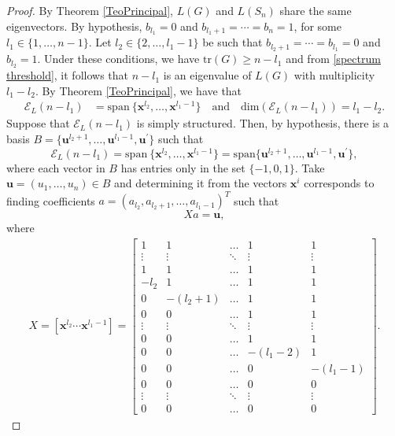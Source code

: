 \documentclass[10pt,a4paper]{amsart}
\begin{document}
\begin{proof}
By Theorem \ref{TeoPrincipal}, $L(G)$ and $L(S_n)$ share the same eigenvectors. By hypothesis,  $b_{l_1}=0$ and $b_{l_1+1}=\cdots=b_{n}=1$, for some $l_1 \in \{1, \ldots, n-1\}$. Let $l_2 \in \{2, \ldots,l_1-1\}$ be such that $b_{l_2+1}=\cdots=b_{l_1}=0$ and $b_{l_2}=1$. Under these conditions, we have $\text{tr}(G)\geq n-l_1$ and from \eqref{spectrum  threshold}, it follows that $n-l_1$ is an eigenvalue of $L(G)$ with multiplicity $l_1-l_2$. By Theorem \ref{TeoPrincipal}, we have that  
\begin{align*}
    \mathcal{E}_L(n-l_1)&=\mathrm{span} \ \{ \mathbf{x}^{l_2}, \ldots, \mathbf{x}^{l_1-1} \} \quad  \textrm{and} \quad \mathrm{dim}(\mathcal{E}_{L}(n-l_1)) = l_1-l_2.
\end{align*} 
Suppose that $\mathcal{E}_L(n-l_1)$ is simply structured. Then, by hypothesis, there is a basis $B=\{\mathbf{u}^{l_2+1}, \ldots, \mathbf{u}^{l_1-1}, \mathbf{u}^{\prime}\}$ such that 
$$\mathcal{E}_L(n-l_1)=\mathrm{span} \ \{ \mathbf{x}^{l_2}, \ldots, \mathbf{x}^{l_1-1} \} = \mathrm{span}\{\mathbf{u}^{l_2+1}, \ldots, \mathbf{u}^{l_1-1},\mathbf{u}^{\prime}\},$$
where each vector in $B$ has entries only in the set $\{-1,0,1\}$.
Take $\mathbf{u}=(u_{1}, \ldots, u_{n}) \in B$ and determining it from the vectors $\mathbf{x}^{i}$ corresponds to finding coefficients $a=(a_{l_2}, a_{l_2+1}, \ldots, a_{l_1-1})^{T}$ such that 
\begin{equation}\label{eq:sistemalinear(n-k)}
    X a = \mathbf{u},
\end{equation}
where 
\begin{align*}
    X=[\mathbf{x}^{l_2}\cdots\mathbf{x}^{l_1-1}]=\left[\begin{array}{ccccc}
        1          & 1            & \ldots      & 1           & 1 \\ 
        \vdots     & \vdots       & \ddots      & \vdots      & \vdots \\ 
        1          & 1            & \ldots      & 1           & 1 \\
        -l_2         & 1            & \ldots      & 1           & 1 \\ 
        0          & -(l_2+1)       & \ldots      & 1           & 1 \\ 
        0          & 0            & \ldots      & 1           & 1 \\
        \vdots     & \vdots       & \ddots      & \vdots      & \vdots \\ 
        0          & 0            & \ldots      & 1           & 1 \\ 
        0          & 0            & \ldots      & -(l_1-2)    & 1 \\ 
        0          & 0            & \ldots      & 0           & -(l_1-1) \\
        0          & 0            & \ldots      & 0           & 0 \\ 
        \vdots     & \vdots       & \ddots      & \vdots      & \vdots \\ 
        0          & 0            & \ldots      & 0           & 0  
    \end{array}\right]. 
\end{align*}


\end{proof}
\end{document}

